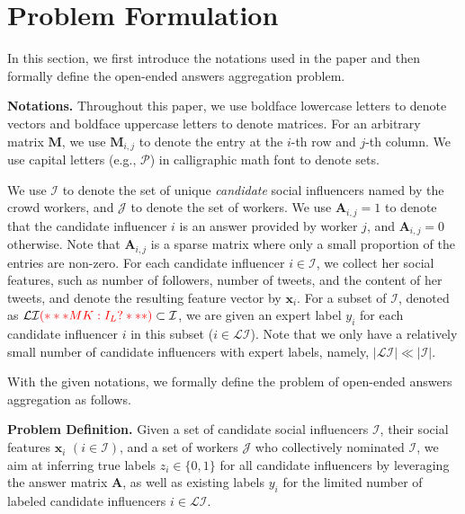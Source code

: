 \section{Problem Formulation}

In this section, we first introduce the notations used in the paper and then formally define the open-ended answers aggregation problem.

\smallskip
\noindent\textbf{Notations.} Throughout this paper, we use boldface lowercase letters to denote vectors and boldface uppercase letters to denote matrices. For an arbitrary matrix $\mathbf{M}$, we use $\mathbf{M}_{i,j}$ to denote the entry at the $i$-th row and $j$-th column. We use capital letters (e.g., $\mathcal{P}$) in calligraphic math font to denote sets. 

We use $\mathcal{I}$ to denote the set of unique \emph{candidate} social influencers named by the crowd workers, and $\mathcal{J}$ to denote the set of workers. We use $\mathbf{A}_{i,j}=1$ to denote that the candidate influencer $i$ is an answer provided by worker $j$, and $\mathbf{A}_{i,j}=0$ otherwise. Note that $\mathbf{A}_{i,j}$ is a sparse matrix where only a small proportion of the entries are non-zero. 
For each candidate influencer $i \in \mathcal{I}$, we collect her social features, such as number of followers, number of tweets, and the content of her tweets, and denote the resulting feature vector by $\mathbf{x}_i$. For a subset of $\mathcal{I}$, denoted as $\mathcal{LI} \textcolor{red}{(*** MK: I_L? ***)}\subset \mathcal{I}$, we are given an expert label $y_i$ for each candidate influencer $i$ in this subset ($i\in \mathcal{LI}$). Note that we only have a relatively small number of candidate influencers with expert labels, namely, $|\mathcal{LI}| \ll |\mathcal{I}|$. %



With the given notations, we formally define the problem of open-ended answers aggregation as follows.

\smallskip
\noindent\textbf{Problem Definition.} Given a set of candidate social influencers $\mathcal{I}$, their social features $\mathbf{x}_i$ $(i \in \mathcal{I})$, and a set of workers $\mathcal{J}$ who collectively nominated $\mathcal{I}$, we aim at inferring true labels $z_i \in \{0,1\}$ for all candidate influencers by leveraging the answer matrix $\mathbf{A}$, as well as existing labels $y_i$ for the limited number of labeled candidate influencers $i\in \mathcal{LI}$. 
